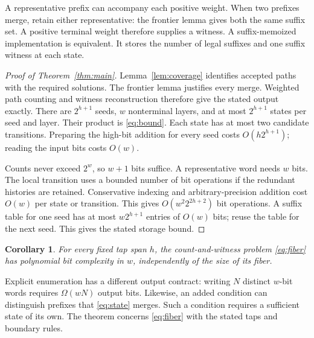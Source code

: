 \documentclass[11pt,a4paper]{article}
\newtheorem{corollary}[theorem]{Corollary}
\theoremstyle{definition}\newtheorem{definition}[theorem]{Definition}
\begin{document}
A representative prefix can accompany each positive weight.
When two prefixes merge, retain either representative: the frontier lemma gives
both the same suffix set. A positive terminal weight therefore supplies a
witness. A suffix-memoized implementation is equivalent. It stores the number
of legal suffixes and one suffix witness at each state.

\begin{proof}[Proof of Theorem~\ref{thm:main}]
Lemma~\ref{lem:coverage} identifies accepted paths with the required solutions.
The frontier lemma justifies every merge. Weighted path counting and witness
reconstruction therefore give the stated output exactly.
There are $2^{h+1}$ seeds, $w$ nonterminal layers, and at most $2^{h+1}$ states
per seed and layer. Their product is \eqref{eq:bound}.
Each state has at most two candidate transitions.
Preparing the high-bit addition for every seed costs $O(h2^{h+1})$;
reading the input bits costs $O(w)$.

Counts never exceed $2^w$, so $w+1$ bits suffice.
A representative word needs $w$ bits. The local transition uses a bounded
number of bit operations if the redundant histories are retained.
Conservative indexing and arbitrary-precision addition cost $O(w)$ per
state or transition. This gives $O(w^2 2^{2h+2})$ bit operations.
A suffix table for one seed has at most $w2^{h+1}$ entries of $O(w)$ bits;
reuse the table for the next seed. This gives the stated storage bound.
\end{proof}

\begin{corollary}
For every fixed tap span $h$, the count-and-witness problem \eqref{eq:fiber}
has polynomial bit complexity in $w$, independently of the size of its fiber.
\end{corollary}
Explicit enumeration has a different output contract: writing $N$ distinct
$w$-bit words requires $\Omega(wN)$ output bits.
Likewise, an added condition can distinguish prefixes that \eqref{eq:state}
merges. Such a condition requires a sufficient state of its own.
The theorem concerns \eqref{eq:fiber} with the stated taps and boundary rules.
\end{document}
